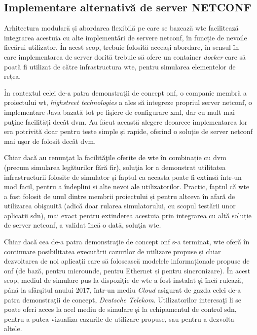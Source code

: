 \subsection{Implementare alternativă de server NETCONF}

Arhitectura modulară și abordarea flexibilă pe care se bazează \gls{wte} facilitează integrarea acestuia cu alte implementări de servere \gls{netconf}, în funcție de nevoile fiecărui utilizator. În acest scop, trebuie folosită aceeași abordare, în sensul în care implementarea de server dorită trebuie să ofere un container \textit{docker} care să poată fi utilizat de către infrastructura \gls{wte}, pentru simularea elementelor de rețea.

În contextul celei de-a patra demonstraţii de concept \gls{onf}, o companie membră a proiectului \gls{wt}, \textit{highstreet technologies} a ales să integreze propriul server \gls{netconf}, o implementare Java bazată tot pe fişiere de configurare \gls{xml}, dar cu mult mai puţine facilități decât \gls{dvm}. Au făcut această alegere deoarece implementarea lor era potrivită doar pentru teste simple și rapide, oferind o soluție de server \gls{netconf} mai uşor de folosit decât \gls{dvm}.

Chiar dacă au renunţat la facilităţile oferite de \gls{wte} în combinație cu \gls{dvm} (precum simularea legăturilor fără fir), soluţia lor a demonstrat utilitatea infrastructurii folosite de simulator și faptul ca aceasta poate fi extinsă într-un mod facil, pentru a îndeplini și alte nevoi ale utilizatorilor. Practic, faptul că \gls{wte} a fost folosit de unul dintre membrii proiectului și pentru altceva în afară de utilizarea obişnuită (adică doar rularea simulatorului, cu scopul testării unor aplicații \gls{sdn}), mai exact pentru extinderea acestuia prin integrarea cu altă soluție de server \gls{netconf}, a validat încă o dată, soluţia \gls{wte}.

Chiar dacă cea de-a patra demonstraţie de concept \gls{onf} s-a terminat, \gls{wte} oferă în continuare posibilitatea executării cazurilor de utilizare propuse și chiar dezvoltarea de noi aplicații care să folosească modelele informaționale propuse de \gls{onf} (de bază, pentru microunde, pentru Ethernet și pentru sincronizare). În acest scop, mediul de simulare pus la dispoziţie de \gls{wte} a fost instalat și încă rulează, până la sfârşitul anului 2017, într-un mediu \textit{Cloud} asigurat de gazda celei de-a patra demonstraţii de concept, \textit{Deutsche Telekom}. Utilizatorilor interesaţi li se poate oferi acces la acel mediu de simulare și la echipamentul de control \gls{sdn}, pentru a putea vizualiza cazurile de utilizare propuse, sau pentru a dezvolta altele.